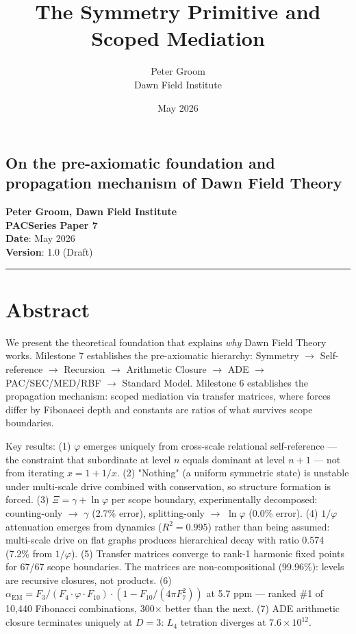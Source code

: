 \documentclass[11pt,a4paper]{article}
\title{The Symmetry Primitive and Scoped Mediation}
\author{Peter Groom \\ Dawn Field Institute}
\date{May 2026}
\begin{document}
\maketitle

\subsection*{On the pre-axiomatic foundation and propagation mechanism of Dawn Field Theory}

\textbf{Peter Groom, Dawn Field Institute} \\
\textbf{PACSeries Paper 7} \\
\textbf{Date}: May 2026 \\
\textbf{Version}: 1.0 (Draft)

\begin{center}\rule{0.5\linewidth}{0.4pt}\end{center}

\section*{Abstract}

We present the theoretical foundation that explains \emph{why} Dawn Field Theory works. Milestone 7 establishes the pre-axiomatic hierarchy: Symmetry $\to$ Self-reference $\to$ Recursion $\to$ Arithmetic Closure $\to$ ADE $\to$ PAC/SEC/MED/RBF $\to$ Standard Model. Milestone 6 establishes the propagation mechanism: scoped mediation via transfer matrices, where forces differ by Fibonacci depth and constants are ratios of what survives scope boundaries.

Key results: (1) $\varphi$ emerges uniquely from cross-scale relational self-reference — the constraint that subordinate at level $n$ equals dominant at level $n+1$ — not from iterating $x = 1 + 1/x$. (2) "Nothing" (a uniform symmetric state) is unstable under multi-scale drive combined with conservation, so structure formation is forced. (3) $\Xi = \gamma + \ln\varphi$ per scope boundary, experimentally decomposed: counting-only $\to$ $\gamma$ (2.7\% error), splitting-only $\to$ $\ln\varphi$ (0.0\% error). (4) $1/\varphi$ attenuation emerges from dynamics ($R^2 = 0.995$) rather than being assumed: multi-scale drive on flat graphs produces hierarchical decay with ratio 0.574 (7.2\% from $1/\varphi$). (5) Transfer matrices converge to rank-1 harmonic fixed points for 67/67 scope boundaries. The matrices are non-compositional (99.96\%): levels are recursive closures, not products. (6) $\alpha_{\text{EM}} = F_3/(F_4 \cdot \varphi \cdot F_{10}) \cdot (1 - F_{10}/(4\pi F_7^2))$ at 5.7 ppm — ranked \#1 of 10,440 Fibonacci combinations, 300$\times$ better than the next. (7) ADE arithmetic closure terminates uniquely at $D = 3$: $L_4$ tetration diverges at $7.6 \times 10^{12}$.
\end{document}
